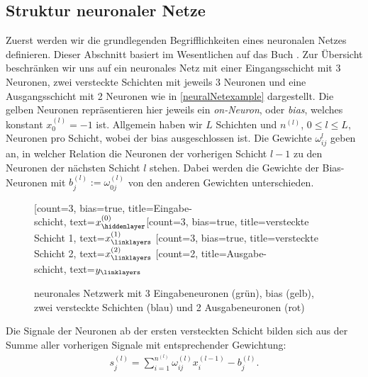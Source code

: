 \subsection{Struktur neuronaler Netze}
\label{subsec:struktur-eines-neuronalen-netzes}
Zuerst werden wir die grundlegenden Begrifflichkeiten eines neuronalen Netzes definieren. Dieser Abschnitt basiert im
Wesentlichen auf das Buch \cite{ovidiucalinDeepLearningArchitectures}. Zur Übersicht beschränken wir uns auf ein
neuronales Netz mit einer Eingangsschicht mit $3$ Neuronen, zwei versteckte Schichten mit jeweils 3 Neuronen und eine
Ausgangsschicht mit 2 Neuronen wie in \eqref{neuralNetexample} dargestellt. Die gelben Neuronen repräsentieren hier
jeweils ein \textit{on-Neuron}, oder \textit{bias}, welches konstant $x_0^{(l)} = -1$ ist. Allgemein haben wir $L$
Schichten und $n^{(l)}$, $0\leq l \leq L$, Neuronen pro Schicht, wobei der bias ausgeschlossen ist. Die Gewichte $\omega_{ij}^{l}$
geben an, in welcher Relation die Neuronen der vorherigen Schicht $l-1$ zu den Neuronen der nächsten Schicht $l$ stehen.
Dabei werden die Gewichte der Bias-Neuronen mit $b_j^{(l)}:= \omega_{0j}^{(l)}$ von den anderen Gewichten unterschieden.
\begin{figure}[htp]
    \centering
    \begin{neuralnetwork}[height=4]
        \newcommand{\x}[2]{$x^{(0)}_#2$}
        \newcommand{\y}[2]{$y_#2$}
        \newcommand{\hfirst}[2]{\small $x^{(1)}_#2$}
        \newcommand{\hsecond}[2]{\small $x^{(2)}_#2$}
        [count=3, bias=true, title=Eingabe-\\schicht, text=\x]
        \hiddenlayer[count=3, bias=true, title=versteckte\\Schicht 1, text=\hfirst]
        \linklayers
        \hiddenlayer[count=3, bias=true, title=versteckte\\Schicht 2, text=\hsecond]
        \linklayers
        \outputlayer[count=2, title=Ausgabe-\\schicht, text=\y] \linklayers
    \end{neuralnetwork}
    \caption{neuronales Netzwerk mit 3 Eingabeneuronen (grün), bias (gelb), zwei versteckte Schichten
        (blau) und 2 Ausgabeneuronen (rot)}
    \label{neuralNetexample}
\end{figure}
Die Signale der Neuronen ab der ersten versteckten Schicht bilden sich aus der Summe aller vorherigen
Signale mit entsprechender Gewichtung:
\begin{align}
    s_j^{(l)} = \sum_{i=1}^{n^{(l)}} \omega_{ij}^{(l)} x_i^{(l-1)} - b_j^{(l)}. \label{eq:signal}
\end{align}
